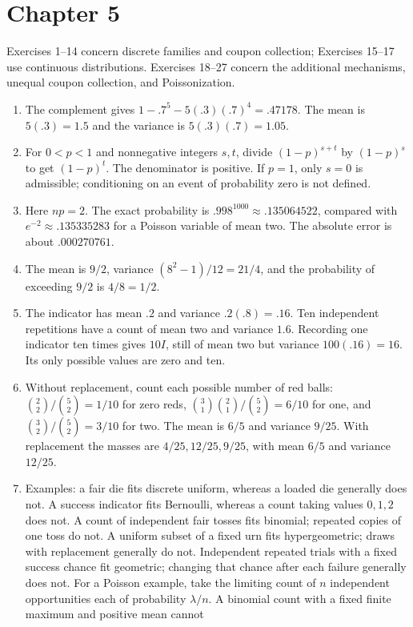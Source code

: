 \section*{Chapter 5}
Exercises 1--14 concern discrete families and coupon collection; Exercises 15--17 use
continuous distributions. Exercises 18--27 concern the additional mechanisms,
unequal coupon collection, and Poissonization.
\begin{enumerate}
 \item The complement gives
 $1-.7^5-5(.3)(.7)^4=.47178$.
 The mean is $5(.3)=1.5$ and the variance is $5(.3)(.7)=1.05$.
 \item For $0<p<1$ and nonnegative integers $s,t$, divide
 $(1-p)^{s+t}$ by $(1-p)^s$ to get $(1-p)^t$.
 The denominator is positive. If $p=1$, only $s=0$ is admissible;
 conditioning on an event of probability zero is not defined.
 \item Here $np=2$. The exact probability is
 $.998^{1000}\approx.135064522$, compared with
 $e^{-2}\approx.135335283$ for a Poisson variable of mean two.
 The absolute error is about $.000270761$.
 \item The mean is $9/2$, variance $(8^2-1)/12=21/4$,
 and the probability of exceeding $9/2$ is $4/8=1/2$.
 \item The indicator has mean $.2$ and variance $.2(.8)=.16$.
 Ten independent repetitions have a count of mean two and variance $1.6$.
 Recording one indicator ten times gives $10I$, still of mean two but
 variance $100(.16)=16$. Its only possible values are zero and ten.
 \item Without replacement, count each possible number of red balls:
 $\binom22/\binom52=1/10$ for zero reds,
 $\binom31\binom21/\binom52=6/10$ for one, and
 $\binom32/\binom52=3/10$ for two.
 The mean is $6/5$ and variance $9/25$.
 With replacement the masses are $4/25,12/25,9/25$,
 with mean $6/5$ and variance $12/25$.
 \item Examples: a fair die fits discrete uniform, whereas a loaded
 die generally does not. A success indicator fits Bernoulli, whereas
 a count taking values $0,1,2$ does not.
 A count of independent fair tosses fits binomial; repeated copies of
 one toss do not. A uniform subset of a fixed urn fits hypergeometric;
 draws with replacement generally do not.
 Independent repeated trials with a fixed success chance fit geometric;
 changing that chance after each failure generally does not.
 For a Poisson example, take the limiting count of $n$ independent
 opportunities each of probability $\lambda/n$.
 A binomial count with a fixed finite maximum and positive mean cannot

\end{enumerate}
